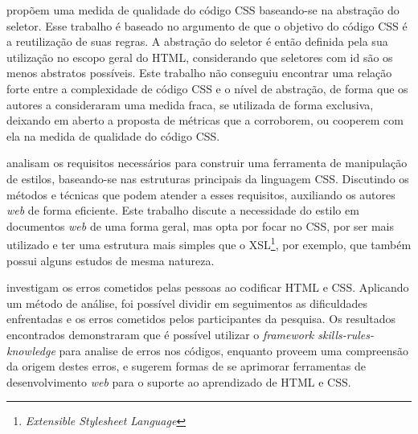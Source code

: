  propõem uma medida de qualidade do código CSS baseando-se na abstração do seletor. Esse trabalho é baseado no argumento de que o objetivo do código CSS é a reutilização de suas regras. A abstração do seletor é então definida pela sua utilização no escopo geral do HTML, considerando que seletores com id são os menos abstratos possíveis. Este trabalho não conseguiu encontrar uma relação forte entre a complexidade de código CSS e o nível de abstração, de forma que os autores a consideraram uma medida fraca, se utilizada de forma exclusiva, deixando em aberto a proposta de métricas que a corroborem, ou cooperem com ela na medida de qualidade do código CSS.

 analisam os requisitos necessários para construir uma ferramenta de manipulação de estilos, baseando-se nas estruturas principais da linguagem CSS. Discutindo os métodos e técnicas que podem atender a esses requisitos, auxiliando os autores \textit{web} de forma eficiente. Este trabalho discute a necessidade do estilo em documentos \textit{web} de uma forma geral, mas opta por focar no CSS, por ser mais utilizado e ter uma estrutura mais simples que o XSL\footnote{\textit{Extensible Stylesheet Language}}, por exemplo, que também possui alguns estudos de mesma natureza.

 investigam os erros cometidos pelas pessoas ao codificar HTML e CSS. Aplicando um método de análise, foi possível dividir em seguimentos as dificuldades enfrentadas e os erros cometidos pelos participantes da pesquisa. Os resultados encontrados demonstraram que é possível utilizar o \textit{framework skills-rules-knowledge} para analise de erros nos códigos, enquanto proveem uma compreensão da origem destes erros, e sugerem formas de se aprimorar ferramentas de desenvolvimento \textit{web} para o suporte ao aprendizado de HTML e CSS.
